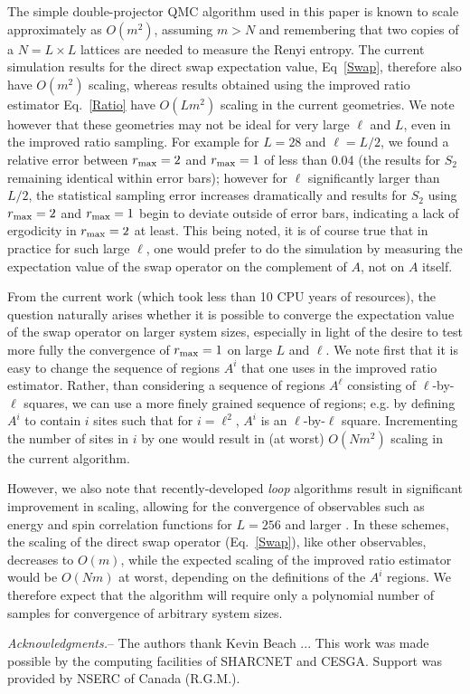 \documentclass[prl,aps,twocolumn,floatfix,amsmath,amssymb,superscriptaddress,tightenlines]{revtex4}
\begin{document}
The simple double-projector QMC algorithm used in this paper is known to scale approximately as $O(m^2)$, \cite{AWSloop}
assuming $m >N$ and remembering that two copies of a $N=L \times L$ lattices are needed to measure the Renyi
 entropy.
  The current simulation results for the direct swap expectation value, Eq~\eqref{Swap}, therefore also have
 $O(m^2)$ scaling, whereas results obtained using the improved ratio estimator Eq.~\eqref{Ratio} have $O(Lm^2)$ scaling in the current geometries.
We note however that these geometries may not be ideal for very large $\ell$ and $L$, even in the improved ratio sampling.
For example for $L=28$ and  $\ell=L/2$, we found a relative error between $r_{\rm max}=2$ and $r_{\rm max}=1$ of less than 0.04 (the
results for $S_2$ remaining identical within error bars); however for $\ell$ significantly larger than $L/2$, the statistical sampling error
increases dramatically and results for $S_2$ using  $r_{\rm max}=2$ and $r_{\rm max}=1$ begin to deviate outside of error bars,
indicating a lack of ergodicity in $r_{\rm max}=2$ at least.  
This being noted, it is of course true that in practice for such large $\ell$, one would prefer to do the simulation by measuring the 
expectation value of the swap operator on the complement of $A$, not on $A$ itself.

From the current work (which took less than 10 CPU years of resources), 
the question naturally arises whether it is possible to converge the expectation value of the swap operator on
larger system sizes, especially in light of the desire to test more fully the convergence of $r_{\rm max}=1$ on large $L$ and $\ell$.
We note first that it is easy to change the sequence of regions $A^i$ that one uses in the improved ratio estimator.
Rather, than considering a sequence of regions $A^{\ell}$ consisting of $\ell$-by-$\ell$ squares, 
we can use a more finely grained sequence of regions; e.g. by defining $A^i$ to contain
$i$ sites such that for $i=\ell^2$, $A^i$ is an $\ell$-by-$\ell$ square.  Incrementing the number of sites in $i$ by one would result in
(at worst) $O(Nm^2)$ scaling in the current algorithm.  

However, we also note that recently-developed {\it loop} algorithms
result in significant improvement in scaling, allowing for the convergence of observables such as energy and spin correlation functions for $L=256$ and larger \cite{AWSloop}.  In these schemes, the scaling of the direct swap operator (Eq.~\eqref{Swap}), like
other observables, decreases to $O(m)$, while the expected scaling of the improved ratio estimator would be $O(Nm)$ at worst, depending
on the definitions of the $A^i$ regions.
We therefore expect that
the algorithm will require only a polynomial number of samples for convergence of arbitrary system sizes.


{\it Acknowledgments.}-- The authors thank Kevin Beach ...
This work was made possible by the
computing facilities of SHARCNET and CESGA.  Support was provided by NSERC
of Canada (R.G.M.).


\end{document}
